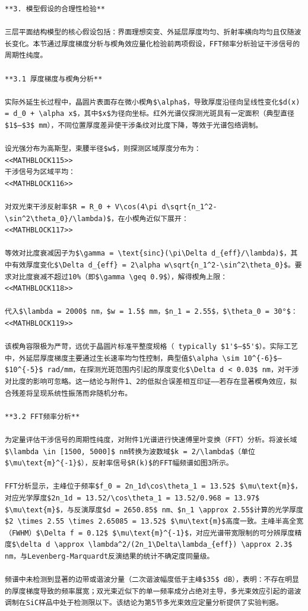\documentclass{mcmthesis}
\begin{document}
\begin{table}[htbp]
\begin{lstlisting}
**3. 模型假设的合理性检验**

三层平面结构模型的核心假设包括：界面理想突变、外延层厚度均匀、折射率横向均匀且仅随波长变化。本节通过厚度梯度分析与楔角效应量化检验前两项假设，FFT频率分析验证干涉信号的周期性纯度。

**3.1 厚度梯度与楔角分析**

实际外延生长过程中，晶圆片表面存在微小楔角$\alpha$，导致厚度沿径向呈线性变化$d(x) = d_0 + \alpha x$，其中$x$为径向坐标。红外光谱仪探测光斑具有一定面积（典型直径$1$–$3$ mm），不同位置厚度差异使干涉条纹对比度下降，等效于光谱包络调制。

设光强分布为高斯型，束腰半径$w$，则探测区域厚度分布为：
<<MATHBLOCK115>>
干涉信号为区域平均：
<<MATHBLOCK116>>

对双光束干涉反射率$R = R_0 + V\cos(4\pi d\sqrt{n_1^2-\sin^2\theta_0}/\lambda)$，在小楔角近似下展开：
<<MATHBLOCK117>>

等效对比度衰减因子为$\gamma = \text{sinc}(\pi\Delta d_{eff}/\lambda)$，其中有效厚度变化$\Delta d_{eff} = 2\alpha w\sqrt{n_1^2-\sin^2\theta_0}$。要求对比度衰减不超过10%（即$\gamma \geq 0.9$），解得楔角上限：
<<MATHBLOCK118>>

代入$\lambda = 2000$ nm，$w = 1.5$ mm，$n_1 = 2.55$，$\theta_0 = 30°$：
<<MATHBLOCK119>>

该楔角容限极为严苛，远优于晶圆片标准平整度规格（ typically $1'$–$5'$）。实际工艺中，外延层厚度梯度主要通过生长速率均匀性控制，典型值$\alpha \sim 10^{-6}$–$10^{-5}$ rad/mm，在探测光斑范围内引起的厚度变化$\Delta d < 0.03$ nm，对干涉对比度的影响可忽略。这一结论与附件1、2的低拟合误差相互印证——若存在显著楔角效应，拟合残差将呈现系统性振荡而非随机分布。

**3.2 FFT频率分析**

为定量评估干涉信号的周期性纯度，对附件1光谱进行快速傅里叶变换（FFT）分析。将波长域$\lambda \in [1500, 5000]$ nm转换为波数域$k = 2/\lambda$（单位$\mu\text{m}^{-1}$），反射率信号$R(k)$的FFT幅频谱如图3所示。

FFT分析显示，主峰位于频率$f_0 = 2n_1d\cos\theta_1 = 13.52$ $\mu\text{m}$，对应光学厚度$2n_1d = 13.52/\cos\theta_1 = 13.52/0.968 = 13.97$ $\mu\text{m}$，与反演厚度$d = 2650.85$ nm、$n_1 \approx 2.55$计算的光学厚度$2 \times 2.55 \times 2.65085 = 13.52$ $\mu\text{m}$高度一致。主峰半高全宽（FWHM）$\Delta f = 0.12$ $\mu\text{m}^{-1}$，对应光谱带宽限制的可分辨厚度精度$\delta d \approx \lambda^2/(2n_1\Delta\lambda_{eff}) \approx 2.3$ nm，与Levenberg-Marquardt反演结果的统计不确定度同量级。

频谱中未检测到显著的边带或谐波分量（二次谐波幅度低于主峰$35$ dB），表明：不存在明显的厚度梯度导致的频率展宽；双光束近似下的单一频率成分占绝对主导，多光束效应引起的谐波调制在SiC样品中处于检测限以下。该结论为第5节多光束效应定量分析提供了实验判据。


\end{lstlisting}
\end{table}
\end{document}
